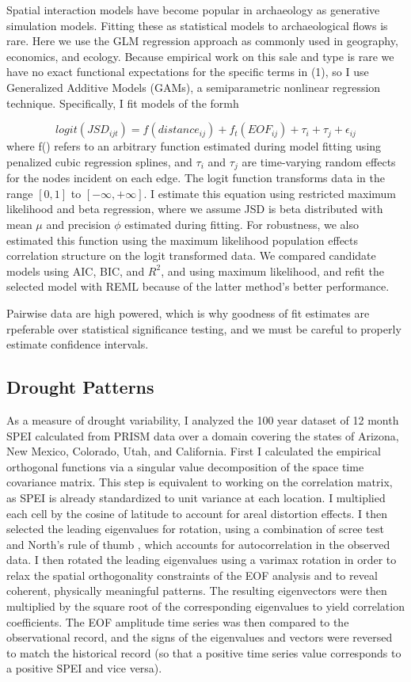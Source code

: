 \documentclass[11pt]{wlscirep}
\begin{document}
Spatial interaction models have become popular in archaeology as generative simulation models. Fitting these as statistical models to archaeological flows is rare. Here we use the GLM regression approach as commonly used in geography, economics, and ecology. Because empirical work on this sale and type is rare we have no exact functional expectations for the specific terms in (1), so I use Generalized Additive Models (GAMs), a semiparametric nonlinear regression technique. Specifically, I fit models of the formh

\begin{equation}
    logit\left(JSD_{ijt}\right) = f(distance_{ij}) + f_t(EOF_{ij}) + \tau_i + \tau_j + \epsilon_{ij}
\end{equation}
where f() refers to an arbitrary function estimated during model fitting using penalized cubic regression splines, and $\tau_i$ and $\tau_j$ are time-varying random effects for the nodes incident on each edge. The logit function transforms data in the range $[0, 1]$ to $[-\infty, +\infty]$. I estimate this equation using restricted maximum likelihood and beta regression, where we assume JSD is beta distributed with mean $\mu$ and precision $\phi$ estimated during fitting. For robustness, we also estimated this function using the maximum likelihood population effects correlation structure on the logit transformed data. We compared candidate models using AIC, BIC, and $R^2$, and using maximum likelihood, and refit the selected model with REML because of the latter method's better performance.

Pairwise data are high powered, which is why goodness of fit estimates are rpeferable over statistical significance testing, and we must be careful to properly estimate confidence intervals.

\subsection*{Drought Patterns}
As a measure of drought variability, I analyzed the 100 year dataset of 12 month SPEI calculated from PRISM data over a domain covering the states of Arizona, New Mexico, Colorado, Utah, and California. First I calculated the empirical orthogonal functions via a singular value decomposition of the space time covariance matrix. This step is equivalent to working on the correlation matrix, as SPEI is already standardized to unit variance at each location. I multiplied each cell by the cosine of latitude to account for areal distortion effects. I then selected the leading eigenvalues for rotation, using a combination of scree test and North's rule of thumb \cite{North1982}, which accounts for autocorrelation in the observed data. I then rotated the leading eigenvalues using a varimax rotation in order to relax the spatial orthogonality constraints of the EOF analysis and to reveal coherent, physically meaningful patterns. The resulting eigenvectors were then multiplied by the square root of the corresponding eigenvalues to yield correlation coefficients. The EOF amplitude time series was then compared to the observational record, and the signs of the eigenvalues and vectors were reversed to match the historical record (so that a positive time series value corresponds to a positive SPEI and vice versa).
\end{document}
